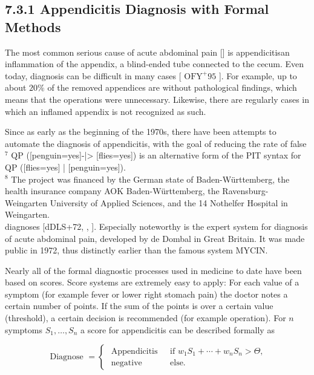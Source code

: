 \documentclass[10pt]{article}
\begin{document}
\subsection*{7.3.1 Appendicitis Diagnosis with Formal Methods}
The most common serious cause of acute abdominal pain [\cite{dedombal1991diagnosis}] is appendicitisan inflammation of the appendix, a blind-ended tube connected to the cecum. Even today, diagnosis can be difficult in many cases [ $\mathrm{OFY}^{+} 95$ ]. For example, up to about $20 \%$ of the removed appendices are without pathological findings, which means that the operations were unnecessary. Likewise, there are regularly cases in which an inflamed appendix is not recognized as such.

Since as early as the beginning of the 1970s, there have been attempts to automate the diagnosis of appendicitis, with the goal of reducing the rate of false\\
${ }^{7}$ QP ([penguin=yes]-|> [flies=yes]) is an alternative form of the PIT syntax for QP ([flies=yes] | [penguin=yes]).\\
${ }^{8}$ The project was financed by the German state of Baden-Württemberg, the health insurance company AOK Baden-Württemberg, the Ravensburg-Weingarten University of Applied Sciences, and the 14 Nothelfer Hospital in Weingarten.\\[0pt]
diagnoses [dDLS+72, \cite{ohmann1994computerunterstuetze}, \cite{ohmann1995diagnosescore}]. Especially noteworthy is the expert system for diagnosis of acute abdominal pain, developed by de Dombal in Great Britain. It was made public in 1972, thus distinctly earlier than the famous system MYCIN.


Nearly all of the formal diagnostic processes used in medicine to date have been based on scores. Score systems are extremely easy to apply: For each value of a symptom (for example fever or lower right stomach pain) the doctor notes a certain number of points. If the sum of the points is over a certain value (threshold), a certain decision is recommended (for example operation). For $n$ symptoms $S_{1}, \ldots, S_{n}$ a score for appendicitis can be described formally as

$$
\text { Diagnose }= \begin{cases}\text { Appendicitis } & \text { if } w_{1} S_{1}+\cdots+w_{n} S_{n}>\Theta, \\ \text { negative } & \text { else. }\end{cases}
$$
\end{document}
